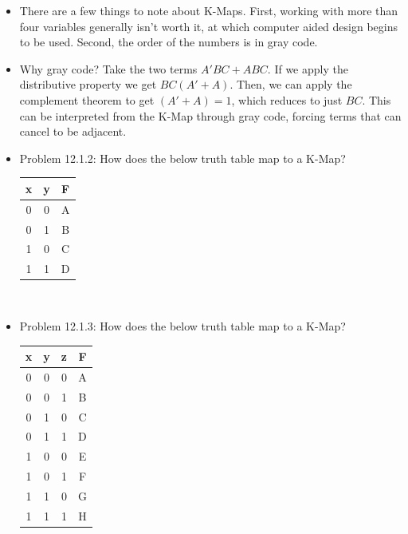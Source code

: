 \documentclass[10pt,a4paper]{article}
\begin{document}
\begin{itemize}
\\
\item There are a few things to note about K-Maps. First, working with more than four variables generally isn't worth it, at which computer aided design begins to be used. Second, the order of the numbers is in gray code. 
\item Why gray code? Take the two terms $A'BC+ABC$. If we apply the distributive property we get $BC(A'+A)$. Then, we can apply the complement theorem to get $(A'+A)=1$, which reduces to just $BC$. This can be interpreted from the K-Map through gray code, forcing terms that can cancel to be adjacent. 
\item Problem 12.1.2: How does the below truth table map to a K-Map?\\
\begin{tabular}{cc|c}
x & y & F\\
\hline
0 & 0 & A\\
0 & 1 & B\\
1 & 0 & C\\
1 & 1 & D\\
\end{tabular}\\
\item Problem 12.1.3: How does the below truth table map to a K-Map?\\
\begin{tabular}{ccc|c}
x & y & z & F\\
\hline
0 & 0 & 0 & A\\
0 & 0 & 1 & B\\
0 & 1 & 0 & C\\
0 & 1 & 1 & D\\
1 & 0 & 0 & E\\
1 & 0 & 1 & F\\
1 & 1 & 0 & G\\
1 & 1 & 1 & H\\
\end{tabular}\\

\end{itemize}
\end{document}
